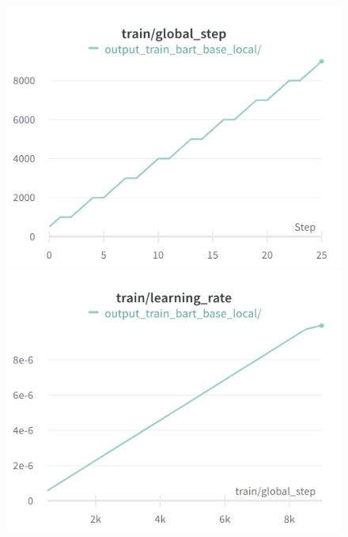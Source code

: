 \begin{figure}[!htb]
\includegraphics[width=\linewidth]{wandb/charts/Section-8-Panel-2-utzp1vfip}
\caption{}
\endminipage\hfill
{}
\includegraphics[width=\linewidth]{wandb/charts/Section-8-Panel-3-g06yu99wh}
\caption{}
\endminipage
\end{figure}


